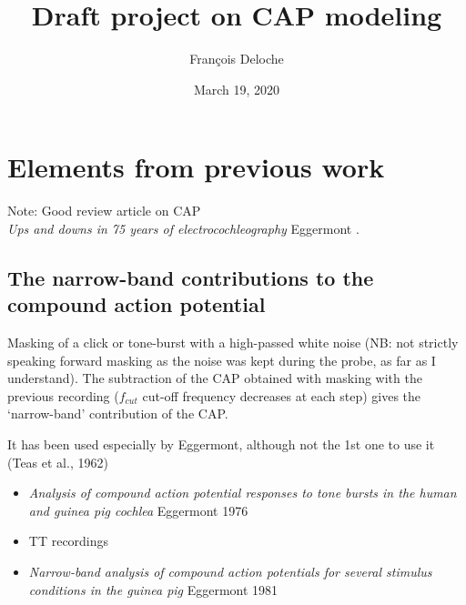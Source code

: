 \documentclass[]{article}
\title{Draft project on CAP modeling}
\author{François Deloche}
\date{March 19, 2020}
\providecommand{\tightlist}{%
  \setlength{\itemsep}{0pt}\setlength{\parskip}{0pt}}
\begin{document}
\maketitle

\section{Elements from previous work}\label{elements-from-previous-work}

Note: Good review article on CAP\\
\emph{Ups and downs in 75 years of electrocochleography} Eggermont
\citep{Eggermont2017}.

\subsection{The narrow-band contributions to the compound action
potential}\label{the-narrow-band-contributions-to-the-compound-action-potential}

Masking of a click or tone-burst with a high-passed white noise (NB: not
strictly speaking forward masking as the noise was kept during the
probe, as far as I understand). The subtraction of the CAP obtained with
masking with the previous recording (\(f_{cut}\) cut-off frequency
decreases at each step) gives the `narrow-band' contribution of the CAP.

It has been used especially by Eggermont, although not the 1st one to
use it (Teas et al., 1962)

\begin{itemize}
\tightlist
\item
  \emph{Analysis of compound action potential responses to tone bursts
  in the human and guinea pig cochlea} Eggermont 1976
  \citep{Eggermont1976}
\item
  TT recordings
\item
  \emph{Narrow-band analysis of compound action potentials for several
  stimulus conditions in the guinea pig} Eggermont 1981
\end{itemize}
\end{document}
